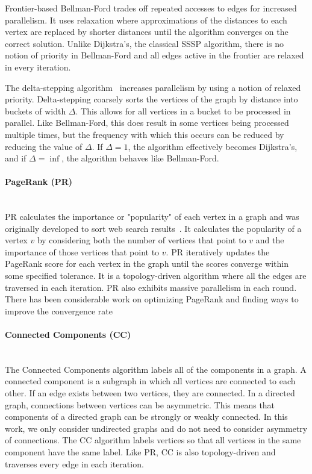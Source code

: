 Frontier-based Bellman-Ford trades off repeated accesses to edges for increased parallelism. 
It uses relaxation where approximations of the distances to each vertex are replaced by shorter distances until the algorithm converges on the correct solution.
Unlike Dijkstra's, the classical SSSP algorithm, there is no notion of priority in Bellman-Ford and all edges active in the frontier are relaxed in every iteration.

The delta-stepping algorithm~\cite{meyer2003delta} increases parallelism by using a notion of relaxed priority. 
Delta-stepping coarsely sorts the vertices of the graph by distance into buckets of width $\Delta$.
This allows for all vertices in a bucket to be processed in parallel. 
Like Bellman-Ford, this does result in some vertices being processed multiple times, but the frequency with which this occurs can be reduced by reducing the value of $\Delta$.
If $\Delta=1$, the algorithm effectively becomes Dijkstra's, and if $\Delta=\inf$, the algorithm behaves like Bellman-Ford. 

\paragraph{PageRank (PR)}\mbox{}\\
PR calculates the importance or "popularity" of each vertex in a graph and was originally developed to sort web search results~\cite{page1999pagerank}.
It calculates the popularity of a vertex $v$ by considering both the number of vertices that point to $v$ and the importance of those vertices that point to $v$.
PR iteratively updates the PageRank score for each vertex in the graph until the scores converge within some specified tolerance.
It is a topology-driven algorithm where all the edges are traversed in each iteration.
PR also exhibits massive parallelism in each round.
There has been considerable work on optimizing PageRank and finding ways to improve the convergence rate~\cite{low2010graphlab,shun2013ligra,kohlschutter2006efficient,berkhin2005survey}

\paragraph{Connected Components (CC)}\mbox{}\\
The Connected Components algorithm labels all of the components in a graph. 
A connected component is a subgraph in which all vertices are connected to each other.
If an edge exists between two vertices, they are connected. 
In a directed graph, connections between vertices can be asymmetric.
This means that components of a directed graph can be strongly or weakly connected. 
In this work, we only consider undirected graphs and do not need to consider asymmetry of connections.
The CC algorithm labels vertices so that all vertices in the same component have the same label.
Like PR, CC is also topology-driven and traverses every edge in each iteration.

